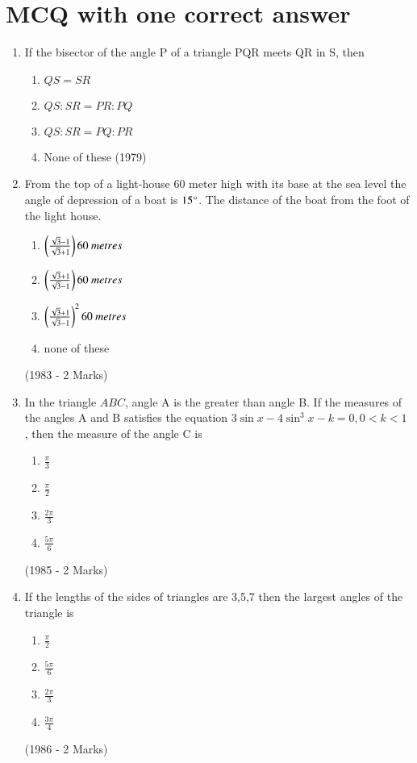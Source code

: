 \documentclass[journal,12pt,onecolumn]{IEEEtran}
\theoremstyle{remark}
\begin{document}
\section{MCQ with one correct answer}
\begin{enumerate}
    \item If the bisector of the angle P of a triangle PQR meets QR in S, then
\begin{multicols}{4}
    \begin{enumerate}
        \item $QS = SR$
        \item $QS : SR = PR : PQ$
        \item $QS : SR = PQ : PR$
        \item None of these \hfill (1979)
    \end{enumerate}
\end{multicols}
    \item From the top of a light-house 60 meter high with its base at the sea level the angle of depression of a boat is  $15\degree$. The distance of the boat from the foot of the light house.
	    \begin{multicols}{2}    
\begin{enumerate}
    \item $\brak{\frac{\sqrt{3}-1}{\sqrt{3}+1}}60\ metres $
    \item $\brak{\frac{\sqrt{3}+1}{\sqrt{3}-1}}60\ metres $
    \item $\left(\frac{\sqrt{3}+1}{\sqrt{3}-1}\right)^2 60\ metres $
    \item none of these 
\end{enumerate}
	    \end{multicols}
		 \hfill (1983 - 2 Marks)
    \item In the triangle $ABC$, angle A is the greater than angle B. If the measures of the angles A and B satisfies the equation $3\sin x - 4 \sin^3 x - k = 0, 0<k<1$ , then the measure of the angle C is 
	    \begin{multicols}{2}
	    \begin{enumerate}
     \item $\frac{\pi}{3}$
     \item $\frac{\pi}{2}$
     \item $\frac{2\pi}{3}$
     \item $\frac{5\pi}{6}$ 
\end{enumerate}
	    \end{multicols}
		\hfill (1985 - 2 Marks)
    \item If the lengths of the sides of triangles are 3,5,7 then the largest angles of the triangle is
	    \begin{multicols}{2}
	    \begin{enumerate}
     \item $\frac{\pi}{2}$
     \item $\frac{5\pi}{6}$
     \item $\frac{2\pi}{3}$
     \item $\frac{3\pi}{4}$ 
	    \end{enumerate}
	    \end{multicols}
		\hfill (1986 - 2 Marks)

\end{enumerate}
\end{document}
